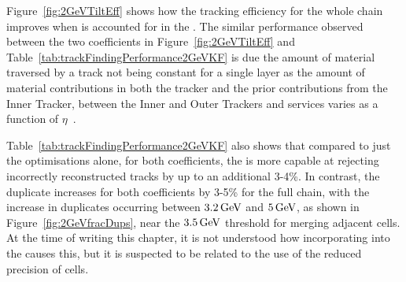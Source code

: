 Figure~\ref{fig:2GeVTiltEff} shows how the tracking efficiency for the whole chain improves when \MS is accounted for in the \KF.
The similar performance observed between the two coefficients in Figure~\ref{fig:2GeVTiltEff} and Table~\ref{tab:trackFindingPerformance2GeVKF} is due the amount of material traversed by a track not being constant for a single layer as the amount of material contributions in both the tracker and the prior contributions from the Inner Tracker, between the Inner and Outer Trackers and services varies as a function of $\eta$~\cite{P2TrackerTDR}.

Table~\ref{tab:trackFindingPerformance2GeVKF} also shows that compared to just the \HT optimisations alone, for both \MS coefficients, the \KF is more capable at rejecting incorrectly reconstructed tracks by up to an additional 3-4\%.
In contrast, the duplicate increases for both coefficients by 3-5\% for the full chain, with the increase in duplicates occurring between $3.2\,\text{Ge\hspace{-.08em}V}$ and $5\,\text{Ge\hspace{-.08em}V}$, as shown in Figure~\ref{fig:2GeVfracDups}, near the $3.5\,\text{Ge\hspace{-.08em}V}$ threshold for merging adjacent \HT cells.
At the time of writing this chapter, it is not understood how incorporating \MS into the \KF causes this, but it is suspected to be related to the use of the reduced precision of \HT cells.

\begin{table}[htbp]
\label{tab:trackFindingPerformance2GeVKF}
\centering
\end{table}

